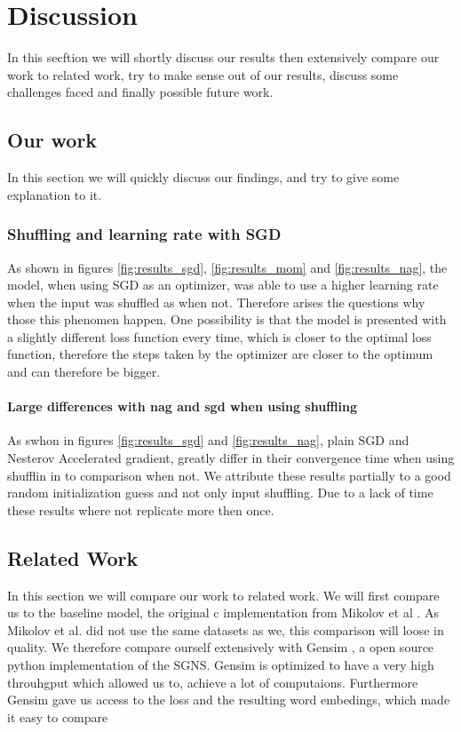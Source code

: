 \chapter{Discussion}\label{chap:discussion}



In this secftion we will shortly discuss our results then extensively compare our work to related work, try to make sense out of our results, discuss some challenges faced and finally possible future work. 

\section{Our work}
In this section we will quickly discuss our findings, and try to give some explanation to it.  
\subsection{Shuffling and learning rate with SGD}
As shown in figures \ref{fig:results_sgd}, \ref{fig:results_mom} and \ref{fig:results_nag}, the model, when using SGD as an optimizer,  was able to use a higher learning rate when the input was shuffled as when not. Therefore arises the questions why those this phenomen happen. One possibility is that the model is presented with a slightly different loss function every time, which is closer to the optimal loss function, therefore the steps taken by the optimizer are closer to the optimum and can therefore be bigger. 

\subsubsection{Large differences with nag and sgd when using shuffling}
As swhon in figures \ref{fig:results_sgd} and \ref{fig:results_nag}, plain SGD and Nesterov Accelerated gradient, greatly differ in their convergence time when using shufflin in to comparison when not. We attribute these results partially to a good random initialization guess and not only input shuffling. Due to a lack of time these results where not replicate more then once. 

\section{Related Work}
In this section we will compare our work to related work. We will first compare us to the baseline model, the original c implementation from Mikolov et al \cite{Mikolov}. As Mikolov et al. did not use the same datasets as we, this comparison will loose in quality. We therefore compare ourself extensively with Gensim \cite{gensim}, a open source python implementation of the SGNS. Gensim is optimized to have a very high throuhgput which allowed us to, achieve a lot of computaions. Furthermore Gensim gave us access to the loss and the resulting word embedings, which made it easy to compare 

